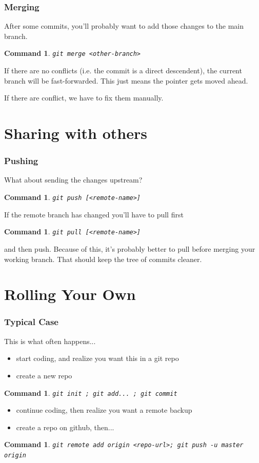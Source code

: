 \documentclass{beamer}
\newtheorem{command}[theorem]{Command}
\begin{document}
\begin{frame}
    \frametitle{Merging}
    After some commits, you'll probably want to add those changes to the main branch.
    \begin{command}
        \texttt{git merge <other-branch>}
    \end{command}
    If there are no conflicts (i.e. the commit is a direct descendent), the current branch will be fast-forwarded. This just means the pointer gets moved ahead.

    If there are conflict, we have to fix them manually.
\end{frame}

\section{Sharing with others}

\begin{frame}
    \frametitle{Pushing}
    What about sending the changes upstream?
    \begin{command}
        \texttt{git push [<remote-name>]}
    \end{command}
    \pause
    If the remote branch has changed you'll have to pull first
    \begin{command}
        \texttt{git pull [<remote-name>]}
    \end{command}
    and then push.
    \pause
    Because of this, it's probably better to pull before merging your working branch. That should keep the tree of commits cleaner.
\end{frame}


\section{Rolling Your Own}

\begin{frame}
    \frametitle{Typical Case}
    This is what often happens...
    \begin{itemize}
        \item start coding, and realize you want this in a git repo
        \item create a new repo
    \end{itemize}
    \begin{command}
        \texttt{git init ; git add... ; git commit}
    \end{command}
    \begin{itemize}
        \item continue coding, then realize you want a remote backup
        \item create a repo on github, then...
    \end{itemize}
    \begin{command}
        \texttt{git remote add origin <repo-url>; git push -u master origin}
    \end{command}
\end{frame}
\end{document}
